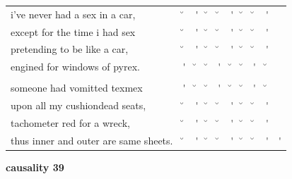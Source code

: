 \documentclass[12pt, landscape]{article}
\begin{document}
\begin{center}
\begin{tabularx}{\textwidth}{
>{\lefting\arraybackslash}X
c
c
c
c
c
c
c
c
c
}

i've never had a sex in a car, & \u{} & \'{} & \u{} & \u{} & \'{} & \u{} & \u{} & \'{} & \\
except for the time i had sex & \u{} & \'{} & \u{} & \u{} & \'{} & \u{} & \u{} & \'{} & \\
pretending to be like a car, & \u{} & \'{} & \u{} & \u{} & \'{} & \u{} & \u{} & \'{} & \\
engined for windows of pyrex. & \'{} & \u{} & \u{} & \'{} & \u{} & \u{} & \'{} & \u{} & \\
 & & & & & & & & \\
someone had vomitted texmex & \'{} & \u{} & \u{} & \'{} & \u{} & \u{} & \'{} & \u{} & \\
upon all my cushiondead seats, & \u{} & \'{} & \u{} & \u{} & \'{} & \u{} & \u{} & \'{} & \\
tachometer red for a wreck, & \u{} & \'{} & \u{} & \u{} & \'{} & \u{} & \u{} & \'{} & \\
thus inner and outer are same sheets. & \u{} & \'{} & \u{} & \u{} & \'{} & \u{} & \u{} & \'{} & \'{} \\

\end{tabularx}
\end{center}

\vspace*{\fill}

\newpage

\vspace*{\fill}

\noindent \textbf{causality 39}
\noindent \hfill \par
\end{document}
